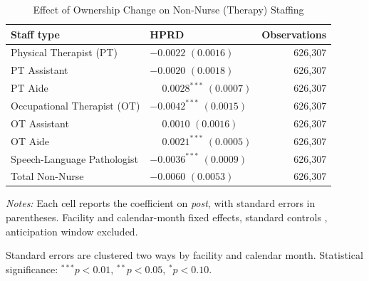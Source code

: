 \documentclass[12pt]{article}
\begin{document}
\begin{table}[H]
\centering
\begin{threeparttable}
\caption{Effect of Ownership Change on Non-Nurse (Therapy) Staffing}
\label{tab:twfe-post-non-nurse}
\small
\setlength{\tabcolsep}{6pt}
\begin{tabularx}{\textwidth}{@{} l Y r @{}}
\toprule
Staff type & HPRD & Observations \\
\midrule
Physical Therapist (PT) &  & 626,307 \\
PT Assistant &  & 626,307 \\
PT Aide &  & 626,307 \\
Occupational Therapist (OT) &  & 626,307 \\
OT Assistant &  & 626,307 \\
OT Aide &  & 626,307 \\
Speech-Language Pathologist &  & 626,307 \\
Total Non-Nurse &  & 626,307 \\
\bottomrule
\end{tabularx}

\begin{tablenotes}[flushleft]
\footnotesize
\item \textit{Notes:} Each cell reports the coefficient on \textit{post}, with standard errors in parentheses. Facility and calendar-month fixed effects, standard controls , anticipation window excluded.
\item Standard errors are clustered two ways by facility and calendar month. Statistical significance: $^{***}p<0.01$, $^{**}p<0.05$, $^{*}p<0.10$.
\end{tablenotes}
\end{threeparttable}
\end{table}
\end{document}
